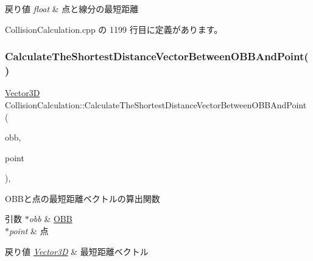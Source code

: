 \begin{DoxyRetVals}{戻り値}
{\em float} & 点と線分の最短距離 \\
\hline
\end{DoxyRetVals}


 Collision\+Calculation.\+cpp の 1199 行目に定義があります。

\mbox{\label{class_collision_calculation_ac35137f15a3d1a43e3db08048c17d445}} 
\subsubsection{\texorpdfstring{Calculate\+The\+Shortest\+Distance\+Vector\+Between\+O\+B\+B\+And\+Point()}{CalculateTheShortestDistanceVectorBetweenOBBAndPoint()}}
{\footnotesize\ttfamily \mbox{\hyperlink{class_vector3_d}{Vector3D}} Collision\+Calculation\+::\+Calculate\+The\+Shortest\+Distance\+Vector\+Between\+O\+B\+B\+And\+Point (\begin{DoxyParamCaption}\item[{\mbox{\hyperlink{class_o_b_b}{O\+BB}} $\ast$}]{obb,  }\item[{\mbox{\hyperlink{class_vector3_d}{Vector3D}} $\ast$}]{point }\end{DoxyParamCaption})\hspace{0.3cm}{\ttfamily [static]}, {\ttfamily [private]}}



O\+B\+Bと点の最短距離ベクトルの算出関数 


\begin{DoxyParams}{引数}
{\em $\ast$obb} & \mbox{\hyperlink{class_o_b_b}{O\+BB}} \\
\hline
{\em $\ast$point} & 点 \\
\hline
\end{DoxyParams}

\begin{DoxyRetVals}{戻り値}
{\em \mbox{\hyperlink{class_vector3_d}{Vector3D}}} & 最短距離ベクトル \\
\hline
\end{DoxyRetVals}


